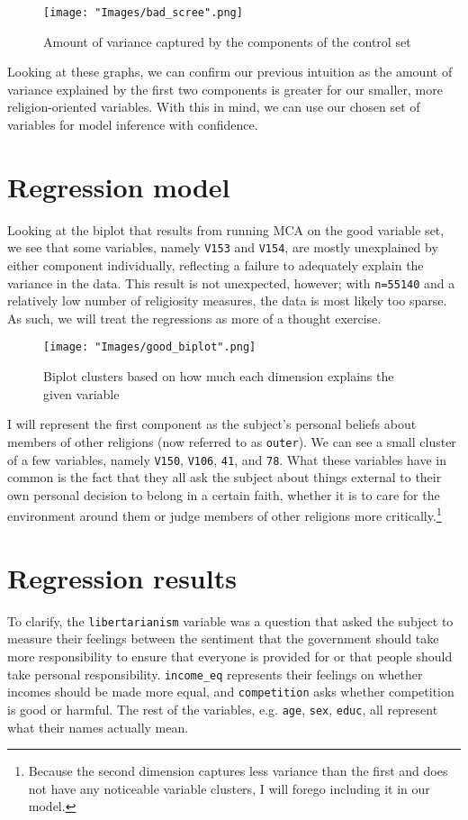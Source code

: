 \documentclass{article}
\begin{document}
	\begin{figure}[h]
		\centering
		\texttt{[image: "Images/bad\_scree".png]}
		\caption{Amount of variance captured by the components of the control set}
	\end{figure}
	
	Looking at these graphs, we can confirm our previous intuition as the amount of variance explained by the first two components is greater for our smaller, more religion-oriented variables. With this in mind, we can use our chosen set of variables for model inference with confidence.
	
	\section{Regression model}
	Looking at the biplot that results from running MCA on the good variable set, we see that some variables, namely \texttt{V153} and \texttt{V154}, are mostly unexplained by either component individually, reflecting a failure to adequately explain the variance in the data. This result is not unexpected, however; with \texttt{n=55140} and a relatively low number of religiosity measures, the data is most likely too sparse. As such, we will treat the regressions as more of a thought exercise.
	
	\begin{figure}[h]
		\centering
		\texttt{[image: "Images/good\_biplot".png]}
		\caption{Biplot clusters based on how much each dimension explains the given variable}
	\end{figure}

	I will represent the first component as the subject's personal beliefs about members of other religions (now referred to as \texttt{outer}). We can see a small cluster of a few variables, namely \texttt{V150}, \texttt{V106}, \texttt{41}, and \texttt{78}. What these variables have in common is the fact that they all ask the subject about things external to their own personal decision to belong in a certain faith, whether it is to care for the environment around them or judge members of other religions more critically.\footnote{Because the second dimension captures less variance than the first and does not have any noticeable variable clusters, I will forego including it in our model.}
	
	\newpage
	\section{Regression results}
	To clarify, the \texttt{libertarianism} variable was a question that asked the subject to measure their feelings between the sentiment that the government should take more responsibility to ensure that everyone is provided for or that people should take personal responsibility. \texttt{income\_eq} represents their feelings on whether incomes should be made more equal, and \texttt{competition} asks whether competition is good or harmful. The rest of the variables, e.g. \texttt{age}, \texttt{sex}, \texttt{educ}, all represent what their names actually mean.
	
\end{document}
